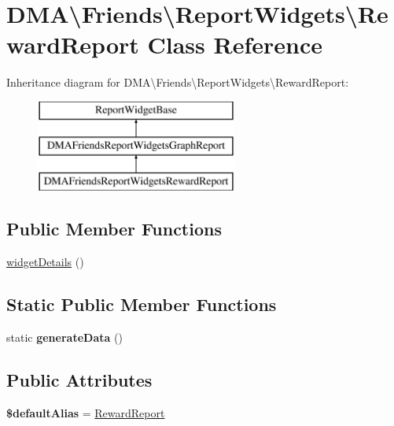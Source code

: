 \hypertarget{classDMA_1_1Friends_1_1ReportWidgets_1_1RewardReport}{}\section{D\+M\+A\textbackslash{}Friends\textbackslash{}Report\+Widgets\textbackslash{}Reward\+Report Class Reference}
\label{classDMA_1_1Friends_1_1ReportWidgets_1_1RewardReport}
Inheritance diagram for D\+M\+A\textbackslash{}Friends\textbackslash{}Report\+Widgets\textbackslash{}Reward\+Report\+:\begin{figure}[H]
\begin{center}
\leavevmode
\includegraphics[height=3.000000cm]{da/d26/classDMA_1_1Friends_1_1ReportWidgets_1_1RewardReport}
\end{center}
\end{figure}
\subsection*{Public Member Functions}
\begin{DoxyCompactItemize}
\item 
\hyperlink{classDMA_1_1Friends_1_1ReportWidgets_1_1RewardReport_a02509e5c1cd5226baadc9761dc08bdf7}{widget\+Details} ()
\end{DoxyCompactItemize}
\subsection*{Static Public Member Functions}
\begin{DoxyCompactItemize}
\item 
\hypertarget{classDMA_1_1Friends_1_1ReportWidgets_1_1RewardReport_ac233a693447b946baf297b0afb3cf23b}{}static {\bfseries generate\+Data} ()\label{classDMA_1_1Friends_1_1ReportWidgets_1_1RewardReport_ac233a693447b946baf297b0afb3cf23b}

\end{DoxyCompactItemize}
\subsection*{Public Attributes}
\begin{DoxyCompactItemize}
\item 
\hypertarget{classDMA_1_1Friends_1_1ReportWidgets_1_1RewardReport_a0b982d8b884d883054bd517489ca154f}{}{\bfseries \$default\+Alias} = \textquotesingle{}\hyperlink{classDMA_1_1Friends_1_1ReportWidgets_1_1RewardReport}{Reward\+Report}\textquotesingle{}\label{classDMA_1_1Friends_1_1ReportWidgets_1_1RewardReport_a0b982d8b884d883054bd517489ca154f}

\end{DoxyCompactItemize}
